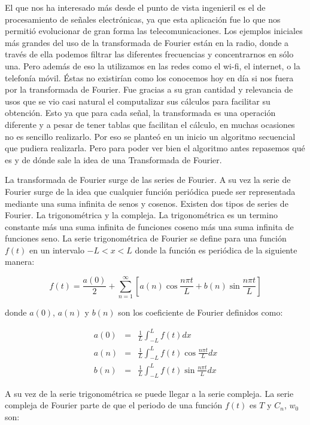 \documentclass{report}
\begin{document}
El que nos ha interesado más desde el punto de vista ingenieril es el de procesamiento de señales electrónicas, ya que esta aplicación fue lo que nos permitió evolucionar de gran forma las telecomunicaciones. Los ejemplos iniciales más grandes del uso de la transformada de Fourier están en la radio, donde a través de ella podemos filtrar las diferentes frecuencias y concentrarnos en sólo una. Pero además de eso la utilizamos en las redes como el wi-fi, el internet, o la telefonía móvil. Éstas no existirían como los conocemos hoy en día si nos fuera por la transformada de Fourier. Fue gracias a su gran cantidad y relevancia de usos que se vio casi natural el computalizar sus cálculos para facilitar su obtención. Esto ya que para cada señal, la transformada es una operación diferente y a pesar de tener tablas que facilitan el cálculo, en muchas ocasiones no es sencillo realizarlo. Por eso se planteó en un inicio un algoritmo secuencial que pudiera realizarla. Pero para poder ver bien el algoritmo antes repasemos qué es y de dónde sale la idea de una Transformada de Fourier.\medskip

La transformada de Fourier surge de las series de Fourier. A su vez la serie de Fourier surge de la idea que cualquier función periódica puede ser representada mediante una suma infinita de senos y cosenos. Existen dos tipos de series de Fourier. La trigonométrica y la compleja. La trigonométrica es un termino constante más una suma infinita de funciones coseno más una suma infinita de funciones seno. La serie trigonométrica de Fourier se define para una función $f\left( t\right) $ en un intervalo $-L<x<L$ donde la función es periódica de la siguiente manera:

\[
f\left( t\right) =\frac{a\left( 0\right) }2+\sum\limits_{n=1}^\infty \left[
a\left( n\right) \cos \frac{n\pi t}L+b\left( n\right) \sin \frac{n\pi t}%
L\right] 
\]

\noindent donde $a\left( 0\right) $, $a\left( n\right) $ y $b\left( n\right) $ son los coeficiente de Fourier definidos como:

\begin{eqnarray*}
a\left( 0\right) &=&\frac 1L\int_{-L}^Lf\left( t\right) dx \\
a\left( n\right) &=&\frac 1L\int_{-L}^Lf\left( t\right) \cos \frac{n\pi t}Ldx
\\
b\left( n\right) &=&\frac 1L\int_{-L}^Lf\left( t\right) \sin \frac{n\pi t}Ldx
\end{eqnarray*}

\noindent A su vez de la serie trigonométrica se puede llegar a la serie compleja. La serie compleja de Fourier parte de que el periodo de una función $f\left( t\right) $ es $T$ y $C_n$, $w_0$ son:
\end{document}
